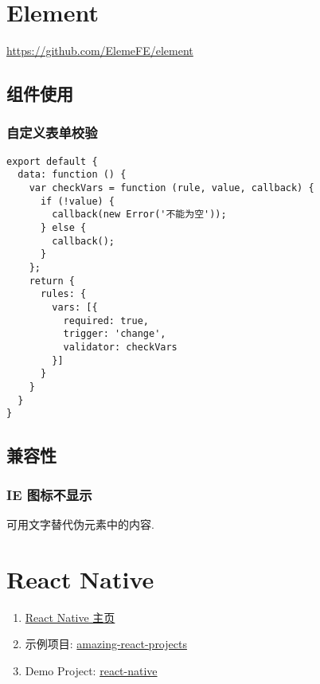 \section{Element}\label{element}

\url{https://github.com/ElemeFE/element}

\subsection{组件使用}\label{ux7ec4ux4ef6ux4f7fux7528}

\subsubsection{自定义表单校验}\label{ux81eaux5b9aux4e49ux8868ux5355ux6821ux9a8c}

\begin{lstlisting}
export default {
  data: function () {
    var checkVars = function (rule, value, callback) {
      if (!value) {
        callback(new Error('不能为空'));
      } else {
        callback();
      }
    };
    return {
      rules: {
        vars: [{
          required: true,
          trigger: 'change',
          validator: checkVars
        }]
      }
    }
  }
}
\end{lstlisting}

\subsection{兼容性}\label{ux517cux5bb9ux6027}

\subsubsection{IE 图标不显示}\label{ie-ux56feux6807ux4e0dux663eux793a}

可用文字替代伪元素中的内容.

\section{React Native}\label{react-native}

\begin{enumerate}
\def\labelenumi{\arabic{enumi}.}
\tightlist
\item
  \href{https://facebook.github.io/react-native}{React Native 主页}
\item
  示例项目:
  \href{https://github.com/jiwonbest/amazing-react-projects}{amazing-react-projects}
\item
  Demo Project:
  \href{https://github.com/HereChen/template/tree/master/react-native}{react-native}
\end{enumerate}

